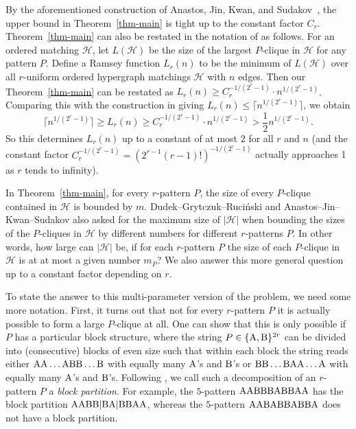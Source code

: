 \documentclass{aic}
\theoremstyle{definition}
\numberwithin{equation}{section}
\numberwithin{figure}{section}
\newcommand{\HH}{\mathcal{H}}
\begin{document}
By the aforementioned construction of Anastos, Jin, Kwan, and Sudakov~\cite[Theorem 1.7]{AJKS}, the upper bound in Theorem~\ref{thm-main} is tight up to the constant factor $C_r$. Theorem~\ref{thm-main} can also be restated in the notation of \cite{AJKS} as follows. For an ordered matching $\HH$, let $L(\HH)$ be the size of the largest $P$-clique in $\HH$ for any pattern $P$. Define a Ramsey function $L_r(n)$ to be the minimum of $L(\HH)$ over all $r$-uniform ordered hypergraph matchings $\HH$ with $n$ edges. Then our Theorem~\ref{thm-main} can be restated as $L_r(n) \ge C_r^{-1/(2^r-1)}\cdot n^{1/(2^r-1)}$. Comparing this with the construction in \cite{AJKS} giving $L_r(n) \le \lceil n^{1/(2^r-1)} \rceil$, we obtain
$$
\lceil n^{1/(2^r-1)} \rceil \ge L_r(n) \ge C_r^{-1/(2^r-1)}\cdot n^{1/(2^r-1)}  > \frac{1}{2}n^{1/(2^r-1)}.
$$
So this determines $L_r(n)$ up to a constant of at most $2$ for all $r$ and $n$ (and the constant factor $C_r^{-1/(2^r-1)}=(2^{r-1}(r-1)!)^{-1/(2^r-1)}$ actually approaches 1 as $r$ tends to infinity).

In Theorem~\ref{thm-main}, for every $r$-pattern $P$, the size of every $P$-clique contained in $\HH$ is bounded by $m$. Dudek--Grytczuk--Ruci\'{n}ski and Anastos--Jin--Kwan--Sudakov also asked for the maximum size of $|\HH|$ when bounding the sizes of the $P$-cliques in $\HH$ by different numbers for different $r$-patterns $P$. In other words, how large can $|\HH|$ be, if for each $r$-pattern $P$ the size of each $P$-clique in $\HH$ is at at most a given number $m_P$? We also answer this more general question up to a constant factor depending on $r$.

To state the answer to this multi-parameter version of the problem, we need some more notation. First, it turns out that not for every $r$-pattern $P$ it is actually possible to form a large $P$-clique at all. One can show that this is only possible if $P$ has a particular block structure, where the string $P\in\{{\rm A},{\rm B}\}^{2r}$ can be divided into (consecutive) blocks of even size such that within each block the string reads either $\rm{AA}\dots\rm{A}\rm {BB}\dots\rm{B}$ with equally many $\rm{A}$'s and $\rm{B}$'s or $\rm{BB}\dots\rm{B}\rm {AA}\dots\rm{A}$ with equally many $\rm{A}$'s and $\rm{B}$'s. Following \cite{AJKS}, we call such a decomposition of an $r$-pattern $P$ a \emph{block partition}. For example, the $5$-pattern $\rm{AABBBABBAA}$ has the block partition $\rm{AABB|BA|BBAA}$, whereas the $5$-pattern $\rm{AABABBABBA}$ does not have a block partition.
\end{document}
